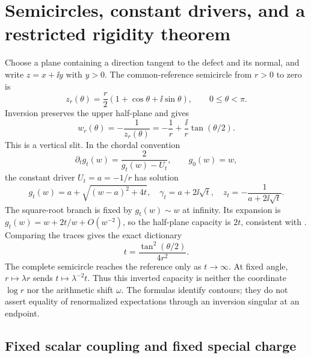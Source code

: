 \section{Semicircles, constant drivers, and a restricted rigidity theorem}\label{sec:geometry}

Choose a plane containing a direction tangent to the defect and its
normal, and write $z=x+\ii y$ with $y>0$. The common-reference semicircle
from $r>0$ to zero is
\begin{equation}\label{eq:semicircle}
 z_r(\theta)=\frac r2(1+\cos\theta+\ii\sin\theta),\qquad0\leq\theta<\pi.
\end{equation}
Inversion preserves the upper half-plane and gives
\begin{equation}
 w_r(\theta)=-\frac1{z_r(\theta)}
 =-\frac1r+\frac{\ii}{r}\tan(\theta/2).
\end{equation}
This is a vertical slit. In the chordal convention
\begin{equation}\label{eq:loewner}
 \partial_t g_t(w)=\frac2{g_t(w)-U_t},\qquad g_0(w)=w,
\end{equation}
the constant driver $U_t=a=-1/r$ has solution
\begin{equation}\label{eq:constant-driver}
 g_t(w)=a+\sqrt{(w-a)^2+4t},\quad
 \gamma_t=a+2\ii\sqrt t,\quad z_t=-\frac1{a+2\ii\sqrt t}.
\end{equation}
The square-root branch is fixed by $g_t(w)\sim w$ at infinity. Its
expansion is $g_t(w)=w+2t/w+O(w^{-2})$, so the half-plane capacity is
$2t$, consistent with \cite[Lecture~2, Proposition~2.17]{Lawler}.
Comparing the traces gives the exact dictionary
\begin{equation}\label{eq:capacity-dictionary}
 t=\frac{\tan^2(\theta/2)}{4r^2}.
\end{equation}
The complete semicircle reaches the reference only as $t\to\infty$.
At fixed angle, $r\mapsto\lambda r$ sends $t\mapsto\lambda^{-2}t$.
Thus this inverted capacity is neither the coordinate $\log r$ nor
the arithmetic shift $\omega$. The formulas identify contours; they
do not assert equality of renormalized expectations through an
inversion singular at an endpoint.

\subsection{Fixed scalar coupling and fixed special charge}

